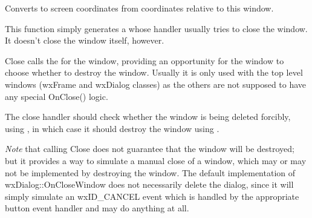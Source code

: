 
Converts to screen coordinates from coordinates relative to this window.





\label{wxwindowclose}


This function simply generates a  whose
handler usually tries to close the window. It doesn't close the window itself,
however.




Close calls the  for the window, providing
an opportunity for the window to choose whether to destroy the window.
Usually it is only used with the top level windows (wxFrame and wxDialog
classes) as the others are not supposed to have any special OnClose() logic.

The close handler should check whether the window is being deleted forcibly,
using , in which case it
should destroy the window using .

{\it Note} that calling Close does not guarantee that the window will be
destroyed; but it provides a way to simulate a manual close of a window, which
may or may not be implemented by destroying the window. The default
implementation of wxDialog::OnCloseWindow does not necessarily delete the
dialog, since it will simply simulate an wxID\_CANCEL event which is handled by
the appropriate button event handler and may do anything at all.

